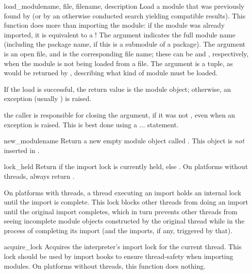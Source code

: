 \begin{funcdesc}{load_module}{name, file, filename, description}
Load a module that was previously found by  (or by
an otherwise conducted search yielding compatible results).  This
function does more than importing the module: if the module was
already imported, it is equivalent to a
!  The  argument
indicates the full module name (including the package name, if this is
a submodule of a package).  The  argument is an open file,
and  is the corresponding file name; these can be
 and , respectively, when the module is not being
loaded from a file.  The  argument is a tuple, as
would be returned by , describing what kind
of module must be loaded.

If the load is successful, the return value is the module object;
otherwise, an exception (usually ) is raised.

 the caller is responsible for closing the
 argument, if it was not , even when an exception
is raised.  This is best done using a 
...  statement.
\end{funcdesc}

\begin{funcdesc}{new_module}{name}
Return a new empty module object called .  This object is
\emph{not} inserted in .
\end{funcdesc}

\begin{funcdesc}{lock_held}{}
Return  if the import lock is currently held, else .
On platforms without threads, always return .

On platforms with threads, a thread executing an import holds an internal
lock until the import is complete.
This lock blocks other threads from doing an import until the original
import completes, which in turn prevents other threads from seeing
incomplete module objects constructed by the original thread while in
the process of completing its import (and the imports, if any,
triggered by that).
\end{funcdesc}

\begin{funcdesc}{acquire_lock}{}
Acquires the interpreter's import lock for the current thread.  This lock
should be used by import hooks to ensure thread-safety when importing modules.
On platforms without threads, this function does nothing.
\end{funcdesc}

